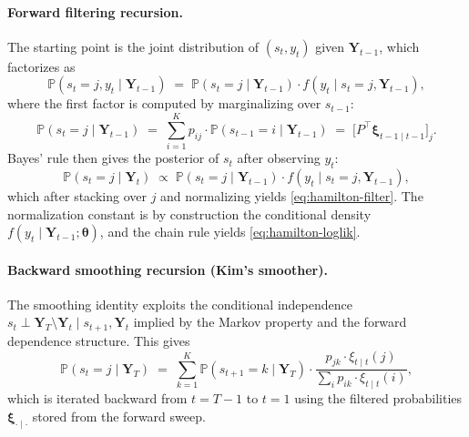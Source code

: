\documentclass[11pt]{article}
\begin{document}
\paragraph{Forward filtering recursion.}  The starting point is the joint distribution of $(s_t, y_t)$ given $\bm{Y}_{t-1}$, which factorizes as
\begin{equation}
    \mathbb{P}(s_t = j, y_t \mid \bm{Y}_{t-1}) \;=\; \mathbb{P}(s_t = j \mid \bm{Y}_{t-1}) \cdot f(y_t \mid s_t = j, \bm{Y}_{t-1}),
\end{equation}
where the first factor is computed by marginalizing over $s_{t-1}$:
\begin{equation}
    \mathbb{P}(s_t = j \mid \bm{Y}_{t-1}) \;=\; \sum_{i=1}^{K} p_{ij} \cdot \mathbb{P}(s_{t-1} = i \mid \bm{Y}_{t-1}) \;=\; \bigl[ P^{\!\top} \bm{\xi}_{t-1 \mid t-1} \bigr]_j.
\end{equation}
Bayes' rule then gives the posterior of $s_t$ after observing $y_t$:
\begin{equation}
    \mathbb{P}(s_t = j \mid \bm{Y}_t) \;\propto\; \mathbb{P}(s_t = j \mid \bm{Y}_{t-1}) \cdot f(y_t \mid s_t = j, \bm{Y}_{t-1}),
\end{equation}
which after stacking over $j$ and normalizing yields \eqref{eq:hamilton-filter}.  The normalization constant is by construction the conditional density $f(y_t \mid \bm{Y}_{t-1}; \bm{\theta})$, and the chain rule yields \eqref{eq:hamilton-loglik}.

\paragraph{Backward smoothing recursion (Kim's smoother).}  The smoothing identity exploits the conditional independence $s_t \perp \bm{Y}_T \setminus \bm{Y}_t \mid s_{t+1}, \bm{Y}_t$ implied by the Markov property and the forward dependence structure.  This gives
\begin{equation}
    \mathbb{P}(s_t = j \mid \bm{Y}_T) \;=\; \sum_{k=1}^{K} \mathbb{P}(s_{t+1} = k \mid \bm{Y}_T) \cdot \frac{ p_{jk} \cdot \xi_{t \mid t}(j) }{ \sum_{i} p_{ik} \cdot \xi_{t \mid t}(i) },
\label{eq:smoother}
\end{equation}
which is iterated backward from $t = T-1$ to $t = 1$ using the filtered probabilities $\bm{\xi}_{\cdot \mid \cdot}$ stored from the forward sweep.
\end{document}
